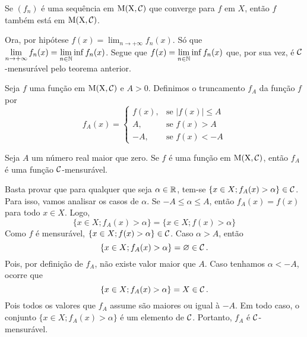 \begin{corollary}
	\label{cor:convergencia-de-uma-sequencia-mensuravel}
	Se $(f_n)$ é uma sequência em $\operatorname{M(X, \mathcal{C} )}$ que converge para $f$ em $X$, então
	$f$ também está em $\operatorname{M(X, \mathcal{C} )}$.
\end{corollary}
\begin{prova}
	Ora, por hipótese $\displaystyle f(x) = \lim_{n \to +\infty} f_n(x)$.
	Só que $\displaystyle \lim_{n \to +\infty} f_n(x) = \lim_{n \in \operatorname{\mathbb{N}}} \inf f_n(x)$.
	Segue que $\displaystyle f(x) = \lim_{n \in \operatorname{\mathbb{N}}} \inf f_n(x)$ que, por sua vez, é $\operatorname{\mathcal{C}}$-mensurável pelo teorema anterior.
\end{prova}

\begin{definition}
	Seja $f$ uma função em $\operatorname{M(X, \mathcal{C} )}$ e $A > 0$.
	Definimos o truncamento $f_A$ da função $f$ por
	$$ f_A(x) =
	\left\{\begin{array}{cc}
		f(x), & \textrm{se\ } |f(x)| \leq A \\
		A, & \textrm{se\ } f(x) > A \\
		-A, & \textrm{se\ } f(x) < -A 
	\end{array}\right.
	$$
\end{definition}

\begin{proposition}
	\label{prop:truncamento-mensurável}
	Seja $A$ um número real maior que zero.
	Se $f$ é uma função em $\operatorname{M(X, \mathcal{C} )}$, então $f_A$ é uma função $\operatorname{\mathcal{C}}$-mensurável.
\end{proposition}
\begin{prova}
	Basta provar que para qualquer que seja $\alpha \in \mathbb{R}$, tem-se $\{x \in X; f_A(x) > \alpha\} \in \operatorname{\mathcal{C}}$.
	Para isso, vamos analisar os casos de $\alpha$.
	Se $-A \leq \alpha \leq A$, então $f_A(x) = f(x)$ para todo $x \in X$.
	Logo, 
	$$
	\{x \in X; f_A(x) > \alpha \} = \{x \in X; f(x) > \alpha \}
	$$
	Como $f$ é mensurável, $\{x \in X; f(x) > \alpha \} \in \operatorname{\mathcal{C}}$.
	Caso $\alpha > A$, então
	$$
	\{x \in X; f_A(x) > \alpha \} = \varnothing \in \operatorname{\mathcal{C}}.
	$$
	Pois, por definição de $f_A$, não existe valor maior que $A$.
	Caso tenhamos $\alpha < -A$, ocorre que
	$$
	\{x \in X; f_A(x) > \alpha \} = X \in \operatorname{\mathcal{C}}.
	$$
	Pois todos os valores que $f_A$ assume são maiores ou igual à $-A$.
	Em todo caso, o conjunto $\{x \in X; f_A(x) > \alpha\}$ é um elemento de $\operatorname{\mathcal{C}}$.
	Portanto, $f_A$ é $\operatorname{\mathcal{C}}$-mensurável. 
\end{prova}

